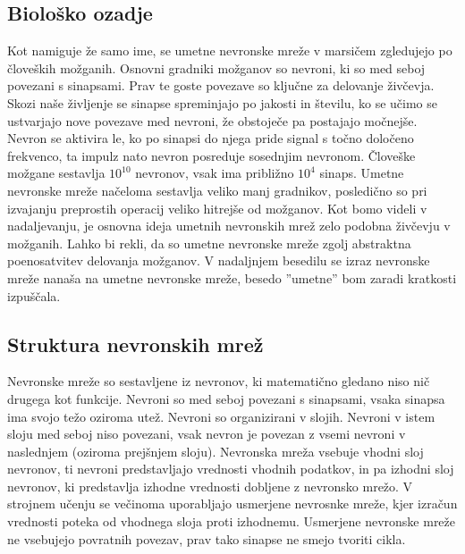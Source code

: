 \documentclass[mat1]{fmfdelo}
\begin{document}
\subsection{Biološko ozadje}
Kot namiguje že samo ime, se umetne nevronske mreže v marsičem zgledujejo po človeških možganih. Osnovni gradniki možganov so nevroni, ki so med seboj povezani s sinapsami. Prav te goste povezave so ključne za delovanje živčevja. Skozi naše življenje se sinapse spreminjajo po jakosti in številu, ko se učimo se ustvarjajo nove povezave med nevroni, že obstoječe pa postajajo močnejše. Nevron se aktivira le,  ko po sinapsi do njega pride signal s točno določeno frekvenco, ta impulz nato nevron posreduje sosednjim nevronom. Človeške možgane sestavlja $10^{10}$ nevronov, vsak  ima približno $10^4$ sinaps. Umetne nevronske mreže načeloma sestavlja veliko manj gradnikov, posledično so pri izvajanju preprostih operacij veliko hitrejše od možganov. Kot bomo videli v nadaljevanju, je osnovna ideja umetnih nevronskih mrež zelo podobna živčevju v možganih. Lahko bi rekli, da so umetne nevronske mreže zgolj abstraktna poenosatvitev delovanja možganov. V nadaljnjem besedilu se izraz nevronske mreže nanaša na umetne nevronske mreže, besedo ''umetne'' bom zaradi kratkosti izpuščala.   
%
\subsection{Struktura nevronskih mrež}
Nevronske mreže so sestavljene iz nevronov, ki matematično gledano niso nič drugega kot funkcije. Nevroni so med seboj povezani s sinapsami, vsaka sinapsa ima svojo težo oziroma utež.
 Nevroni so organizirani v slojih. Nevroni v istem sloju med seboj niso povezani, vsak nevron je povezan z vsemi nevroni v naslednjem (oziroma prejšnjem sloju). Nevronska mreža vsebuje vhodni sloj nevronov, ti nevroni predstavljajo vrednosti vhodnih podatkov, in pa izhodni sloj nevronov, ki predstavlja izhodne vrednosti dobljene z nevronsko mrežo. V strojnem učenju se večinoma uporabljajo usmerjene nevrosnke mreže, kjer izračun vrednosti poteka od vhodnega sloja proti izhodnemu. Usmerjene nevronske mreže ne vsebujejo povratnih povezav, prav tako sinapse ne smejo tvoriti cikla.
 
\end{document}
